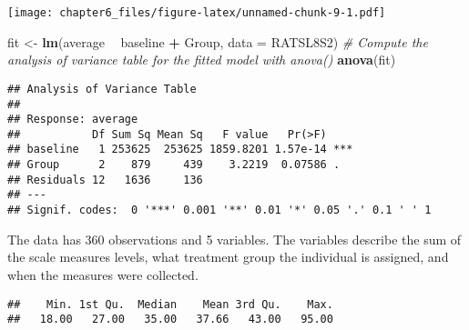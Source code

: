 \documentclass[]{article}
\newenvironment{Shaded}{\begin{snugshade}}{\end{snugshade}}
\newcommand{\CommentTok}[1]{\textcolor[rgb]{0.56,0.35,0.01}{\textit{#1}}}
\newcommand{\DataTypeTok}[1]{\textcolor[rgb]{0.13,0.29,0.53}{#1}}
\newcommand{\KeywordTok}[1]{\textcolor[rgb]{0.13,0.29,0.53}{\textbf{#1}}}
\newcommand{\NormalTok}[1]{#1}
\newcommand{\OperatorTok}[1]{\textcolor[rgb]{0.81,0.36,0.00}{\textbf{#1}}}
\newcommand{\StringTok}[1]{\textcolor[rgb]{0.31,0.60,0.02}{#1}}
\begin{document}
\texttt{[image: chapter6\_files/figure-latex/unnamed-chunk-9-1.pdf]}

\begin{Shaded}
\end{Shaded}

\begin{Shaded}
\begin{Highlighting}[]
\NormalTok{fit <-}\StringTok{ }\KeywordTok{lm}\NormalTok{(average }\OperatorTok{~}\StringTok{ }\NormalTok{baseline }\OperatorTok{+}\StringTok{ }\NormalTok{Group, }\DataTypeTok{data =}\NormalTok{ RATSL8S2)}
\CommentTok{# Compute the analysis of variance table for the fitted model with anova()}
\KeywordTok{anova}\NormalTok{(fit)}
\end{Highlighting}
\end{Shaded}

\begin{verbatim}
## Analysis of Variance Table
## 
## Response: average
##           Df Sum Sq Mean Sq   F value   Pr(>F)    
## baseline   1 253625  253625 1859.8201 1.57e-14 ***
## Group      2    879     439    3.2219  0.07586 .  
## Residuals 12   1636     136                       
## ---
## Signif. codes:  0 '***' 0.001 '**' 0.01 '*' 0.05 '.' 0.1 ' ' 1
\end{verbatim}

The data has 360 observations and 5 variables. The variables describe
the sum of the scale measures levels, what treatment group the
individual is assigned, and when the measures were collected.

\begin{Shaded}
\end{Shaded}

\begin{verbatim}
##    Min. 1st Qu.  Median    Mean 3rd Qu.    Max. 
##   18.00   27.00   35.00   37.66   43.00   95.00
\end{verbatim}

\begin{Shaded}
\end{Shaded}
\end{document}

